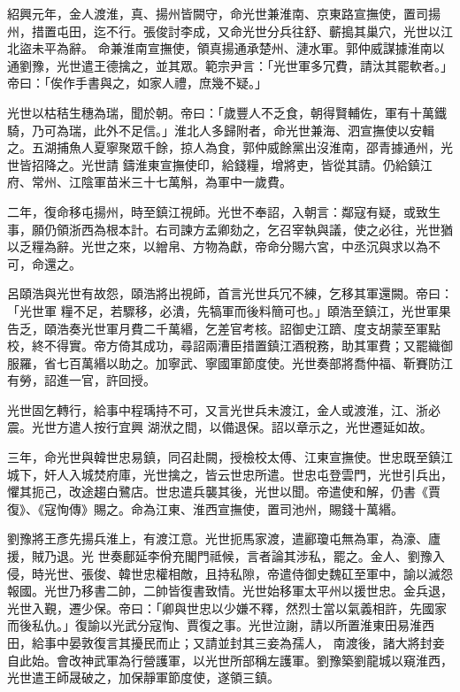 \begin{pinyinscope}
 紹興元年，金人渡淮，真、揚州皆闕守，命光世兼淮南、京東路宣撫使，置司揚州，措置屯田，迄不行。張俊討李成，又命光世分兵往舒、蘄搗其巢穴，光世以江北盜未平為辭。
 命兼淮南宣撫使，領真揚通承楚州、漣水軍。郭仲威謀據淮南以通劉豫，光世遣王德擒之，並其眾。範宗尹言：「光世軍多冗費，請汰其罷軟者。」帝曰：「俟作手書與之，如家人禮，庶幾不疑。」



 光世以枯秸生穗為瑞，聞於朝。帝曰：「歲豐人不乏食，朝得賢輔佐，軍有十萬鐵騎，乃可為瑞，此外不足信。」淮北人多歸附者，命光世兼海、泗宣撫使以安輯之。五湖捕魚人夏寧聚眾千餘，掠人為食，郭仲威餘黨出沒淮南，邵青據通州，光世皆招降之。光世請
 鑄淮東宣撫使印，給錢糧，增將吏，皆從其請。仍給鎮江府、常州、江陰軍苗米三十七萬斛，為軍中一歲費。



 二年，復命移屯揚州，時至鎮江視師。光世不奉詔，入朝言：鄰寇有疑，或致生事，願仍領浙西為根本計。右司諫方孟卿劾之，乞召宰執與議，使之必往，光世猶以乏糧為辭。光世之來，以繒帛、方物為獻，帝命分賜六宮，中丞沉與求以為不可，命還之。



 呂頤浩與光世有故怨，頤浩將出視師，首言光世兵冗不練，乞移其軍還闕。帝曰：「光世軍
 糧不足，若驟移，必潰，先犒軍而後料簡可也。」頤浩至鎮江，光世軍果告乏，頤浩奏光世軍月費二千萬緡，乞差官考核。詔御史江躋、度支胡蒙至軍點校，終不得實。帝方倚其成功，尋詔兩漕臣措置鎮江酒稅務，助其軍費；又罷織御服羅，省七百萬緡以助之。加寧武、寧國軍節度使。光世奏部將喬仲福、靳賽防江有勞，詔進一官，許回授。



 光世固乞轉行，給事中程瑀持不可，又言光世兵未渡江，金人或渡淮，江、浙必震。光世方遣人按行宜興
 湖洑之間，以備退保。詔以章示之，光世遷延如故。



 三年，命光世與韓世忠易鎮，同召赴闕，授檢校太傅、江東宣撫使。世忠既至鎮江城下，奸人入城焚府庫，光世擒之，皆云世忠所遣。世忠屯登雲門，光世引兵出，懼其扼己，改途趨白鷺店。世忠遣兵襲其後，光世以聞。帝遣使和解，仍書《賈復》、《寇恂傳》賜之。命為江東、淮西宣撫使，置司池州，賜錢十萬緡。



 劉豫將王彥先揚兵淮上，有渡江意。光世扼馬家渡，遣酈瓊屯無為軍，為濠、廬援，賊乃退。光
 世奏鄜延李佾充閣門祗候，言者論其涉私，罷之。金人、劉豫入侵，時光世、張俊、韓世忠權相敵，且持私隙，帝遣侍御史魏矼至軍中，諭以滅怨報國。光世乃移書二帥，二帥皆復書致情。光世始移軍太平州以援世忠。金兵退，光世入覲，遷少保。帝曰：「卿與世忠以少嫌不釋，然烈士當以氣義相許，先國家而後私仇。」復諭以光武分寇恂、賈復之事。光世泣謝，請以所置淮東田易淮西田，給事中晏敦復言其擾民而止；又請並封其三妾為孺人，
 南渡後，諸大將封妾自此始。會改神武軍為行營護軍，以光世所部稱左護軍。劉豫築劉龍城以窺淮西，光世遣王師晟破之，加保靜軍節度使，遂領三鎮。




\end{pinyinscope}
